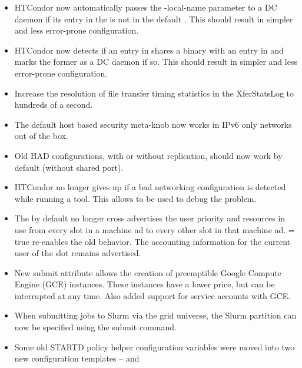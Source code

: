 \begin{itemize}
\item HTCondor now automatically passes the -local-name parameter to a
DC daemon if its entry in the  is not in the default
.  This should result in simpler and less
error-prone configuration.

\item HTCondor now detects if an entry in  shares a
binary with an entry in  and marks the former as
a DC daemon if so.  This should result in simpler and less error-prone
configuration.

\item Increase the resolution of file transfer timing statistics in
the XferStatsLog to hundreds of a second.

\item The default host based security meta-knob now works in IPv6
only networks out of the box.

\item Old HAD configurations, with or without replication, should now work
by default (without shared port).

\item HTCondor no longer gives up if a bad networking configuration is
detected while running a tool.  This allows  to be
used to debug the problem.

\item The  by default no longer cross advertises the
user priority and resources in use from every slot in a machine ad to every
other slot in that machine ad.   = true
re-enables the old behavior.  The accounting information for the current
user of the slot remains advertised.

\item New submit attribute  allows the
creation of preemptible Google Compute Engine (GCE) instances.
These instances have a lower price, but can be interrupted at any time.
Also added support for service accounts with GCE.

\item When submitting jobs to Slurm via the grid universe, the Slurm
partition can now be specified using the 
submit command.

\item Some old STARTD policy helper configuration variables were moved
into two new configuration templates --
and 


\end{itemize}
